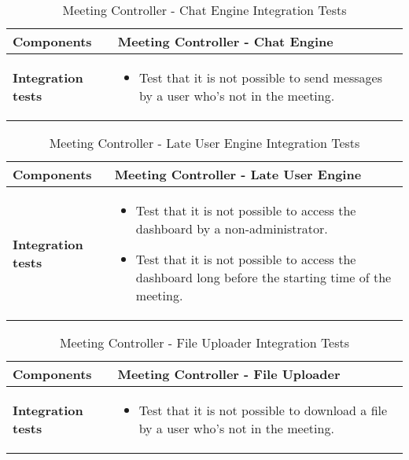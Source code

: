 \begin{table}[H]	
	\centering
	\def\arraystretch{1.5}
	\begin{tabular}{|m{4cm}|m{12cm}|}
		\hline
		\textbf{Components} & Meeting Controller - Chat Engine \\ \hline
		\textbf{Integration tests} & 
			\begin{itemize}
			\item Test that it is not possible to send messages by a user who's not in the meeting.
			\end{itemize} \\ \hline
	\end{tabular}
	\caption{Meeting Controller - Chat Engine Integration Tests}
\end{table}

\begin{table}[H]	
	\centering
	\def\arraystretch{1.5}
	\begin{tabular}{|m{4cm}|m{12cm}|}
		\hline
		\textbf{Components} & Meeting Controller - Late User Engine \\ \hline
		\textbf{Integration tests} & 
			\begin{itemize}
			\item Test that it is not possible to access the dashboard by a non-administrator.
			\item Test that it is not possible to access the dashboard long before the starting time of the meeting.
			\end{itemize} \\ \hline
	\end{tabular}
	\caption{Meeting Controller - Late User Engine Integration Tests}
\end{table}

\begin{table}[H]	
	\centering
	\def\arraystretch{1.5}
	\begin{tabular}{|m{4cm}|m{12cm}|}
		\hline
		\textbf{Components} & Meeting Controller - File Uploader \\ \hline
		\textbf{Integration tests} & 
			\begin{itemize}
			\item Test that it is not possible to download a file by a user who's not in the meeting.
			\end{itemize}  \\ \hline
	\end{tabular}
	\caption{Meeting Controller - File Uploader Integration Tests}
\end{table}


